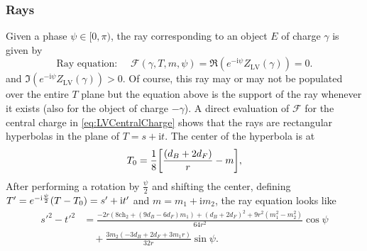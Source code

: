 \documentclass[11pt, a4paper]{article}
\newcommand{\ii}{\mathrm{i}}
\newcommand{\ch}{\mathrm{ch}}
\newcommand{\LV}{\mathrm{LV}}
\numberwithin{equation}{section}
\begin{document}
\subsubsection{Rays}
Given a phase $\psi \in [0, \pi)$, the ray corresponding to an object $E$ of charge $\gamma$ is given by
\begin{equation}
  \text{Ray equation: } \quad \mathcal{F}(\gamma, T, m, \psi) = \Re(e^{-\ii \psi} Z_\LV(\gamma)) = 0.
\end{equation}
and $\Im(e^{-\ii \psi} Z_\LV(\gamma)) > 0$. Of course, this ray may or may not be populated over the entire $T$ plane but the equation above is the support of the ray whenever it exists (also for the object of charge $-\gamma$).
A direct evaluation of $\mathcal{F}$ for the central charge in \cref{eq:LVCentralCharge} shows that the rays are rectangular hyperbolas in the plane of $T = s + \ii t$. The center of the hyperbola is at
\begin{equation}
  T_0 = \frac18 \qty[\frac{(d_B + 2 d_F)}{r} - m],
\end{equation}
After performing a rotation by $\frac{\psi}{2}$ and shifting the center, defining $T' = e^{-\ii \frac{\psi}{2}}\qty(T - T_0) = s' + \ii t'$ and $m = m_1 + \ii m_2$, the ray equation looks like
\begin{equation}
  \begin{split}
    s'^2 - t'^2 &= \frac{-2 r (8 \ch_2+(9 d_B -6 d_F) m_1)+(d_B+2 d_F)^2+9 r^2 (m_1^2-m_2^2)}{64 r^2} \cos \psi \\
    &\quad + \frac{3 m_2 (-3 d_B+2 d_F+3 m_1 r)}{32 r} \sin \psi.
  \end{split}
\end{equation}
\end{document}
